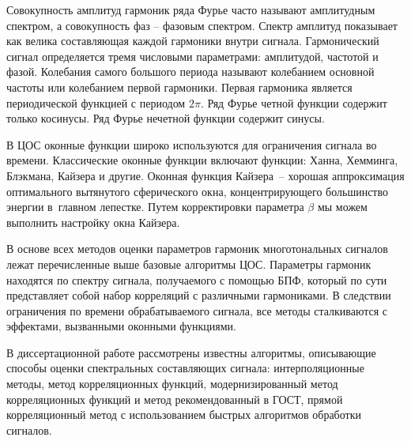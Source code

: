 

Совокупность амплитуд гармоник ряда Фурье часто называют амплитудным спектром, а совокупность фаз -- фазовым спектром. Спектр амплитуд показывает как велика составляющая каждой гармоники внутри сигнала. Гармонический сигнал определяется тремя числовыми параметрами: амплитудой, частотой и фазой. Колебания самого большого периода называют колебанием основной частоты или колебанием первой гармоники. Первая гармоника является периодической функцией с периодом $2 \pi$. Ряд Фурье четной функции содержит только косинусы. Ряд Фурье нечетной функции содержит синусы.

В ЦОС оконные функции широко используются для ограничения сигнала во времени. Классические оконные функции включают функции: Ханна, Хемминга, Блэкмана, Кайзера и другие. Оконная функция Кайзера – хорошая аппроксимация оптимального вытянутого сферического окна, концентрирующего большинство энергии в главном лепестке.
Путем корректировки параметра $\beta$ мы можем выполнить настройку окна
Кайзера.

В основе всех методов оценки параметров гармоник многотональных сигналов лежат перечисленные выше базовые алгоритмы ЦОС. Параметры гармоник находятся по спектру сигнала, получаемого с помощью БПФ, который по сути представляет собой набор корреляций с различными гармониками. В следствии ограничения по времени обрабатываемого сигнала, все методы сталкиваются с эффектами, вызванными оконными функциями.

В диссертационной работе рассмотрены известны алгоритмы, описывающие способы оценки спектральных составляющих сигнала: интерполяционные методы, метод корреляционных функций, модернизированный метод корреляционных функций и метод рекомендованный в ГОСТ, прямой корреляционный метод с использованием быстрых алгоритмов обработки сигналов. 

